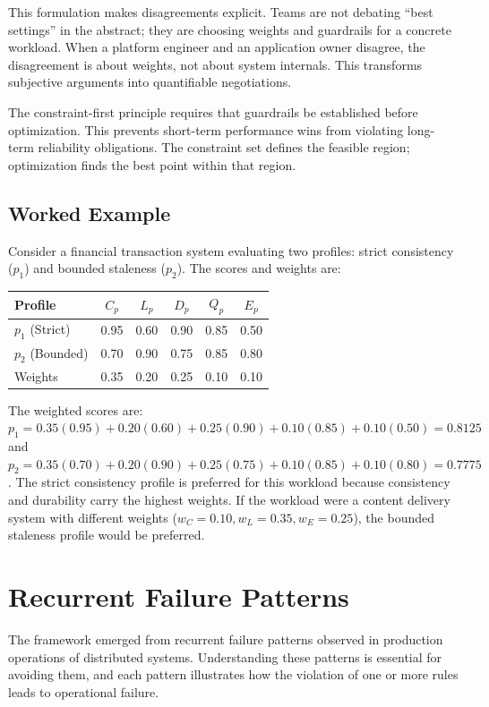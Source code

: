 \documentclass[conference]{IEEEtran}
\begin{document}
This formulation makes disagreements explicit. Teams are not debating ``best settings'' in the abstract; they are choosing weights and guardrails for a concrete workload. When a platform engineer and an application owner disagree, the disagreement is about weights, not about system internals. This transforms subjective arguments into quantifiable negotiations.

The constraint-first principle requires that guardrails be established before optimization. This prevents short-term performance wins from violating long-term reliability obligations. The constraint set defines the feasible region; optimization finds the best point within that region.

\subsection{Worked Example}

Consider a financial transaction system evaluating two profiles: strict consistency ($p_1$) and bounded staleness ($p_2$). The scores and weights are:

\begin{table}[h]
\centering
\small
\begin{tabular}{@{}l c c c c c@{}}
\toprule
Profile & $C_p$ & $L_p$ & $D_p$ & $Q_p$ & $E_p$ \\
\midrule
$p_1$ (Strict) & 0.95 & 0.60 & 0.90 & 0.85 & 0.50 \\
$p_2$ (Bounded) & 0.70 & 0.90 & 0.75 & 0.85 & 0.80 \\
Weights & 0.35 & 0.20 & 0.25 & 0.10 & 0.10 \\
\bottomrule
\end{tabular}
\end{table}

The weighted scores are: $p_1 = 0.35(0.95) + 0.20(0.60) + 0.25(0.90) + 0.10(0.85) + 0.10(0.50) = 0.8125$ and $p_2 = 0.35(0.70) + 0.20(0.90) + 0.25(0.75) + 0.10(0.85) + 0.10(0.80) = 0.7775$. The strict consistency profile is preferred for this workload because consistency and durability carry the highest weights. If the workload were a content delivery system with different weights ($w_C = 0.10, w_L = 0.35, w_E = 0.25$), the bounded staleness profile would be preferred.

\section{Recurrent Failure Patterns}

The framework emerged from recurrent failure patterns observed in production operations of distributed systems. Understanding these patterns is essential for avoiding them, and each pattern illustrates how the violation of one or more rules leads to operational failure.
\end{document}
